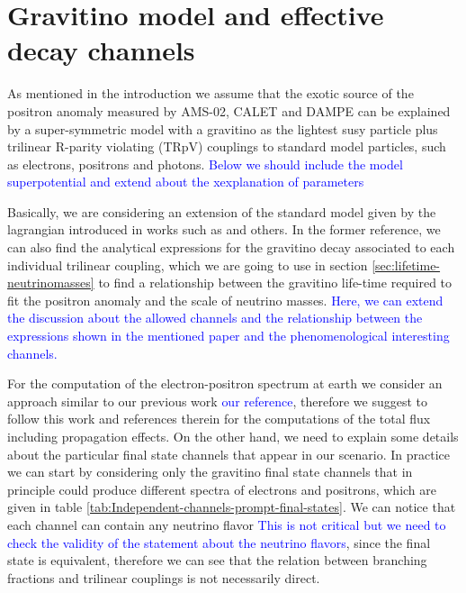 \documentclass[a4paper,11pt]{article}
\newcommand*{\blue}{\textcolor{blue}}
\begin{document}
 
\section{Gravitino model and effective decay channels}
\label{gdecay}

As mentioned in the introduction we assume that the exotic source of the positron anomaly measured by AMS-02, CALET and DAMPE can be explained by a super-symmetric model with a gravitino as the lightest susy particle plus trilinear R-parity violating (TRpV) couplings to standard model particles, such as electrons, positrons and photons. \blue{Below we should include the model superpotential and extend about the xexplanation of parameters}

Basically, we are considering an extension of the standard model given by the lagrangian introduced in
works such as \cite{Moreau:2001sr} and others. In the former reference, we can also find the analytical expressions for the gravitino decay associated to each individual trilinear coupling, which we are going to use in section \ref{sec:lifetime-neutrinomasses} to find a relationship between the gravitino life-time required to fit the positron anomaly and the scale of neutrino masses. \blue{Here, we can extend the discussion about the allowed channels and the relationship between the expressions shown
in the mentioned paper and the phenomenological interesting channels.}

For the computation of the electron-positron spectrum at earth we consider an approach similar to our previous work \blue{our reference}, therefore we suggest to follow this work and references therein for the computations of the total flux including propagation effects. On the other hand, we need to explain some details about the particular final state channels that appear in our scenario. In practice we can start by considering only the gravitino final state channels that in principle could produce different spectra of electrons and positrons, which are given in table \ref{tab:Independent-channels-prompt-final-states}. We can notice that each channel can contain any neutrino flavor \blue{This is not critical but we need to check the validity of the statement about the neutrino flavors}, since the final state is equivalent, therefore we can see that the relation between branching fractions and trilinear couplings is not necessarily direct.
\end{document}
